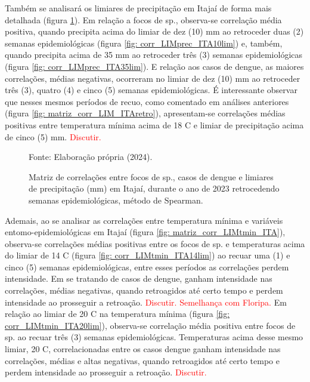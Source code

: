 \documentclass[
	12pt,				%
	openright,			%
	oneside,			%
	a4paper,			%
	english,			%
	french,				%
	spanish,			%
	brazil				%
	dvipsnames, table]{abntex2}
\begin{document}
\indent Também se analisará os limiares de precipitação em Itajaí de forma mais detalhada (figura \ref{fig: matriz_corr_LIMprec_ITA}). Em relação a focos de  sp., observa-se correlação média positiva, quando precipita acima do limiar de dez (10) mm ao retroceder duas (2) semanas epidemiológicas (figura \ref{fig: corr_LIMprec_ITA10lim}) e, também, quando precipita acima de 35 mm ao retroceder três (3) semanas epidemiológicas (figura \ref{fig: corr_LIMprec_ITA35lim}). E relação aos casos de dengue, as maiores correlações, médias negativas, ocorreram no limiar de dez (10) mm ao retroceder três (3), quatro (4) e cinco (5) semanas epidemiológicas. É interessante observar que nesses mesmos períodos de recuo, como comentado em análises anteriores (figura \ref{fig: matriz_corr_LIM_ITAretro}), apresentam-se correlações médias positivas entre temperatura mínima acima de 18 C e limiar de precipitação acima de cinco (5) mm. \textcolor{red}{Discutir.}

\begin{figure}[htbp]
    \begin{center}
    \caption{Matriz de correlações entre focos de  sp., casos de dengue e limiares de precipitação (mm) em Itajaí, durante o ano de 2023 retrocedendo semanas epidemiológicas, método de Spearman.}
    \label{fig: matriz_corr_LIMprec_ITA}
        \hfill
    \end{center}
    \small{Fonte: Elaboração própria (2024).}
\end{figure}

\indent Ademais, ao se analisar as correlações entre temperatura mínima e variáveis entomo-epidemiológicas em Itajaí (figura \ref{fig: matriz_corr_LIMtmin_ITA}), observa-se correlações médias positivas entre os focos de  sp. e temperaturas acima do limiar de 14 C (figura \ref{fig: corr_LIMtmin_ITA14lim}) ao recuar uma (1) e cinco (5) semanas epidemiológicas, entre esses períodos as correlações perdem intensidade. Em se tratando de casos de dengue, ganham intensidade nas correlações, médias negativas, quando retroagidos até certo tempo e perdem intensidade ao prosseguir a retroação. \textcolor{red}{Discutir. Semelhança com Floripa.} Em relação ao limiar de 20 C na temperatura mínima (figura \ref{fig: corr_LIMtmin_ITA20lim}), observa-se correlação média positiva entre focos de  sp. ao recuar três (3) semanas epidemiológicas. Temperaturas acima desse mesmo limiar, 20 C, correlacionadas entre os casos dengue ganham intensidade nas correlações, médias e altas negativas, quando retroagidos até certo tempo e perdem intensidade ao prosseguir a retroação. \textcolor{red}{Discutir.}
\end{document}
